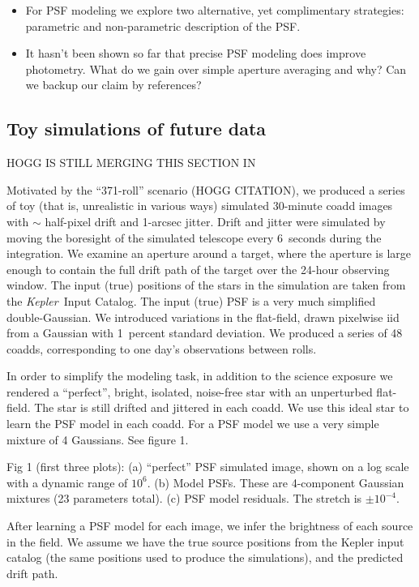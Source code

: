 \documentclass[letterpaper,12pt,preprint]{aastex}
\newcommand{\observatory}[1]{\textsl{#1}}
\newcommand{\Kepler}{\observatory{Kepler}}
\begin{document}
\begin{itemize}
\item For PSF modeling we explore two alternative, yet complimentary
  strategies: parametric and non-parametric description of the PSF.

\item It hasn't been shown so far that precise PSF modeling does
  improve photometry. What do we gain over simple aperture averaging
  and why? Can we backup our claim by references?

\end{itemize}

\subsection{Toy simulations of future data}\label{sec:future}

HOGG IS STILL MERGING THIS SECTION IN

Motivated by the ``371-roll'' scenario (HOGG CITATION),
  we produced a series of toy (that is, unrealistic in various ways)
  simulated 30-minute coadd images with $\sim$ half-pixel drift and 1-arcsec jitter.
Drift and jitter were simulated by moving the boresight of the simulated telescope
  every 6~seconds during the integration.
We examine an aperture around a target,
  where the aperture is large enough to contain the full drift path
  of the target over the 24-hour observing window.
The input (true) positions of the stars in the simulation are
  taken from the \Kepler\ Input Catalog.
The input (true) PSF is a very much simplified double-Gaussian.
We introduced variations in the flat-field,
   drawn pixelwise iid from a Gaussian with 1~percent standard deviation.
We produced a series of 48 coadds,
   corresponding to one day's observations between rolls.

In order to simplify the modeling task, in addition to the science exposure we rendered a ``perfect'', bright, isolated, noise-free star with an unperturbed flat-field.  The star is still drifted and jittered in each coadd.  We use this ideal star to learn the PSF model in each coadd.  For a PSF model we use a very simple mixture of 4 Gaussians.  See figure 1.

Fig 1 (first three plots): (a) ``perfect'' PSF simulated image, shown on a log scale with a dynamic range of $10^6$. (b) Model PSFs.  These are 4-component Gaussian mixtures (23 parameters total).  (c) PSF model residuals.  The stretch is $\pm 10^{-4}$.

After learning a PSF model for each image, we infer the brightness of each source in the field.  We assume we have the true source positions from the Kepler input catalog (the same positions used to produce the simulations), and the predicted drift path.
\end{document}
